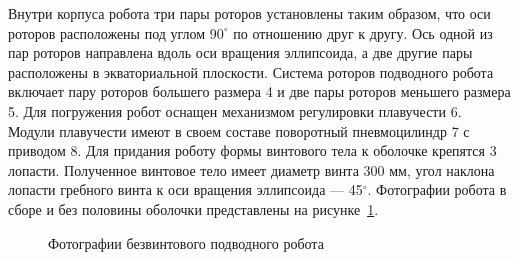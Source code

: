 Внутри корпуса робота три пары роторов установлены таким образом, что оси роторов расположены под углом $90^\circ$ по отношению друг к другу. Ось одной из пар роторов направлена вдоль оси вращения эллипсоида, а две другие пары расположены в экваториальной плоскости. 
Система роторов подводного робота включает пару роторов большего размера 4 и две пары роторов меньшего размера 5. %
Для погружения робот оснащен механизмом регулировки плавучести 6. Модули плавучести имеют в своем составе поворотный пневмоцилиндр 7 с приводом 8. %
Для придания роботу формы винтового тела к оболочке крепятся 3 лопасти. Полученное винтовое тело имеет диаметр винта 300 мм, угол наклона лопасти гребного винта к оси вращения эллипсоида --- 45$^{\circ}$. Фотографии робота в сборе и без половины оболочки представлены на рисунке~\ref{Photo_BPR}. 

\begin{figure}[h]
	\begin{minipage}[h]{0.5\linewidth}
	\end{minipage}
	\hfill
	\begin{minipage}[h]{0.5\linewidth}
	\end{minipage}	
	\caption{Фотографии безвинтового подводного робота}
	\label{Photo_BPR}
\end{figure}


